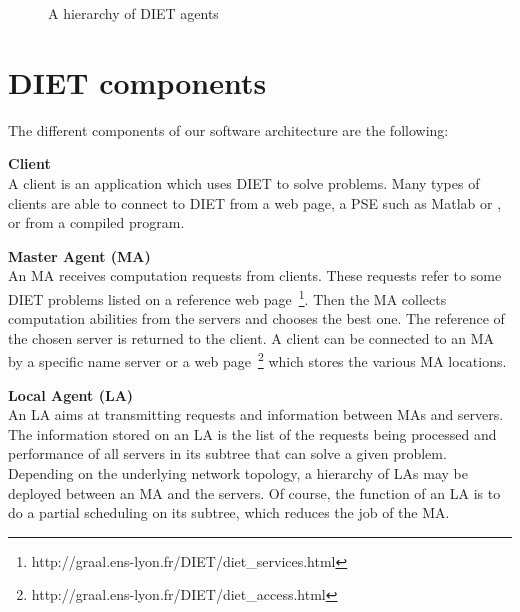 \begin{figure}[htb]
 \begin{center}
  \label{fig:platform}
  \caption{A hierarchy of DIET agents}
 \end{center}
\end{figure}

\section{DIET components}
\label{sec:components}

The different components of our software architecture are the following:      

\begin{description}
\item \textbf{Client}\\
  A client is an application which uses DIET to solve problems.  Many
  types of clients are able to connect to DIET from a web page, a PSE
  such as Matlab or \sci, or from a compiled program.
\item \textbf{Master Agent (MA)}\\
  An MA receives computation requests from clients. These requests
  refer to some DIET problems listed on a reference web
  page~\footnote{http://graal.ens-lyon.fr/DIET/diet\_services.html}.
  Then the MA collects computation abilities from the servers and
  chooses the best one. The reference of the chosen server is returned
  to the client. A client can be connected to an MA by a specific name
  server or a web
  page~\footnote{http://graal.ens-lyon.fr/DIET/diet\_access.html}
  which stores the various MA locations.

\item \textbf{Local Agent (LA)}\\
  An LA aims at transmitting requests and information between MAs and
  servers.  The information stored on an LA is the list of the
  requests being processed and performance of all servers in its
  subtree that can solve a given problem. Depending on the underlying
  network topology, a hierarchy of LAs may be deployed between an MA
  and the servers. Of course, the function of an LA is to do a partial
  scheduling on its subtree, which reduces the job of the MA.


\end{description}
